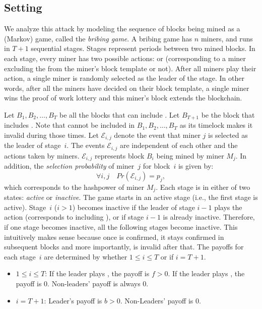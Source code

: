 \subsection{Setting}
We analyze this attack by modeling the sequence of blocks being mined as a (Markov) game, called the \emph{bribing game}. A bribing game has $n$ miners, and runs in $T+1$ sequential stages. Stages represent periods between two mined blocks. In each stage, every miner has two possible actions: \follow{} or  (corresponding to a miner excluding the \sellertxn{} from the miner's block template or not). After all miners play their action, a single miner is randomly selected as the leader of the stage. In other words, after all the miners have decided on their block template, a single miner wins the proof of work lottery and this miner's block extends the blockchain. 

Let $B_1, B_2, \ldots, B_{T}$ be all the blocks that can include \sellertxn{}. Let $B_{T+1}$ be the block that includes \bribetxn{}. Note that \bribetxn{} cannot be included in $B_1, B_2, \ldots, B_{T}$ as its timelock makes it invalid during those times. Let $\mathcal{E}_{i,j}$ denote the event that miner $j$ is selected as the leader of stage~$i$. The events $\mathcal{E}_{i,j}$ are independent of each other and the actions taken by miners. $\mathcal{E}_{i,j}$ represents block $B_i$ being mined by miner $M_j$. In addition, the \emph{selection probability} of miner~$j$ for block~$i$ is given by:  
\[
  \forall i,j \quad Pr(\mathcal{E}_{i,j})= p_j,
\]
which corresponds to the hashpower of miner $M_j$. Each stage is in either of two states: \emph{active} or \emph{inactive}. The game starts in an active stage (i.e., the first stage is active). Stage~$i$ ($i>1$) becomes inactive if the leader of stage $i-1$ plays the action  (corresponds to including \sellertxn{}), or if stage $i-1$ is already inactive. Therefore, if one stage becomes inactive, all the following stages become inactive. This intuitively makes sense because once \sellertxn{} is confirmed, it stays confirmed in subsequent blocks and more importantly, \bribetxn{} is invalid after that. The payoffs for each stage~$i$ are determined by whether $1\leq i\leq T$ or if $i=T+1$.
\begin{itemize}
    \item $1\leq i\leq T$: If the leader plays , the payoff is $f>0$. If the leader plays \follow{}, the payoff is 0. Non-leaders' payoff is always 0.
    \item $i=T+1$: Leader's payoff is $b>0$. Non-Leaders' payoff is 0.
\end{itemize}

